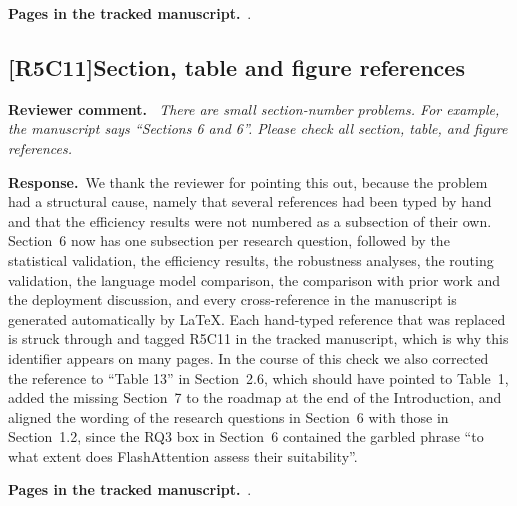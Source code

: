 \documentclass[11pt,a4paper]{article}
\newcommand{\comment}[3]{\subsection*{\textcolor{#1}{[#2]}\enspace #3}}
\newenvironment{reviewercomment}{\par\noindent\textbf{Reviewer comment.}\itshape\ }{\par}
\newcommand{\response}{\par\noindent\textbf{Response.}\ }
\newcommand{\where}[1]{\par\noindent\textbf{Pages in the tracked manuscript.}\ \rvpages[M-]{#1}.}
\begin{document}
\where{R5C10}

\comment{rvFive}{R5C11}{Section, table and figure references}
\begin{reviewercomment}
There are small section-number problems. For example, the manuscript says ``Sections 6 and 6''. Please check all section, table, and figure references.
\end{reviewercomment}
\response We thank the reviewer for pointing this out, because the problem had a structural cause, namely that several references had been typed by hand and that the efficiency results were not numbered as a subsection of their own. Section~6 now has one subsection per research question, followed by the statistical validation, the efficiency results, the robustness analyses, the routing validation, the language model comparison, the comparison with prior work and the deployment discussion, and every cross-reference in the manuscript is generated automatically by LaTeX. Each hand-typed reference that was replaced is struck through and tagged R5C11 in the tracked manuscript, which is why this identifier appears on many pages. In the course of this check we also corrected the reference to ``Table 13'' in Section~2.6, which should have pointed to Table~1, added the missing Section~7 to the roadmap at the end of the Introduction, and aligned the wording of the research questions in Section~6 with those in Section~1.2, since the RQ3 box in Section~6 contained the garbled phrase ``to what extent does FlashAttention assess their suitability''.

\where{R5C11}
\end{document}
